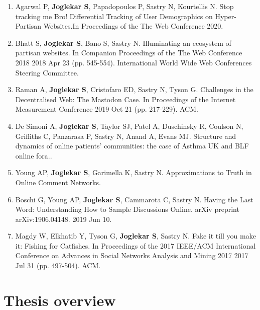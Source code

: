 \begin{enumerate}
    \item Agarwal P, \textbf{Joglekar S}, Papadopoulos P, Sastry N, Kourtellis N. Stop tracking me Bro! Differential Tracking of User Demographics on Hyper-Partisan Websites.In Proceedings of the The Web Conference 2020.
    
    \item Bhatt S, \textbf{Joglekar S}, Bano S, Sastry N. Illuminating an ecosystem of partisan websites. In Companion Proceedings of the The Web Conference 2018 2018 Apr 23 (pp. 545-554). International World Wide Web Conferences Steering Committee.
    
    \item Raman A, \textbf{Joglekar S}, Cristofaro ED, Sastry N, Tyson G. Challenges in the Decentralised Web: The Mastodon Case. In Proceedings of the Internet Measurement Conference 2019 Oct 21 (pp. 217-229). ACM.
    
    \item De Simoni A, \textbf{Joglekar S}, Taylor SJ, Patel A, Duschinsky R, Coulson N, Griffiths C, Panzarasa P, Sastry N, Anand A, Evans MJ. Structure and dynamics of online patients’ communities: the case of Asthma UK and BLF online fora..
    
    \item Young AP, \textbf{Joglekar S}, Garimella K, Sastry N. Approximations to Truth in Online Comment Networks.
    
    \item Boschi G, Young AP, \textbf{Joglekar S}, Cammarota C, Sastry N. Having the Last Word: Understanding How to Sample Discussions Online. arXiv preprint arXiv:1906.04148. 2019 Jun 10.
    
    \item Magdy W, Elkhatib Y, Tyson G, \textbf{Joglekar S}, Sastry N. Fake it till you make it: Fishing for Catfishes. In Proceedings of the 2017 IEEE/ACM International Conference on Advances in Social Networks Analysis and Mining 2017 2017 Jul 31 (pp. 497-504). ACM.    
   
\end{enumerate}


\section{Thesis overview}

